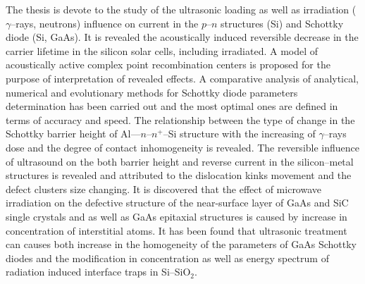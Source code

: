 The thesis is devote to the study of the ultrasonic loading as well as irradiation ($\gamma$--rays, neutrons) influence
on current in the $p$--$n$ structures (Si) and Schottky diode (Si, GaAs).
It is revealed the acoustically induced reversible decrease in the carrier lifetime in the silicon solar cells,
 including irradiated.
 A model of acoustically active complex point recombination centers is proposed for the purpose of interpretation of revealed effects.
 A comparative analysis of analytical, numerical and evolutionary methods for Schottky diode parameters determination  has been carried out and
 the most optimal ones are defined in terms of accuracy and speed.
 The relationship between the type of change in the Schottky barrier height of Al---$n$--$n^+$--Si structure with the increasing of $\gamma$--rays dose
 and the degree of contact inhomogeneity is revealed.
 The reversible influence of ultrasound on the both barrier height and reverse current in the silicon--metal structures is revealed and attributed to
the dislocation kinks movement and the defect clusters size changing.
 It is discovered that the effect of microwave irradiation on the defective structure of the near-surface layer of GaAs and SiC single crystals and as well as GaAs epitaxial structures
 is caused by increase in concentration of interstitial atoms.
 It has been found that ultrasonic treatment can causes both  increase in the homogeneity of the parameters of GaAs Schottky diodes and the modification in concentration as well as energy spectrum of radiation induced interface traps in Si--SiO$_2$.

\keywordsEn
